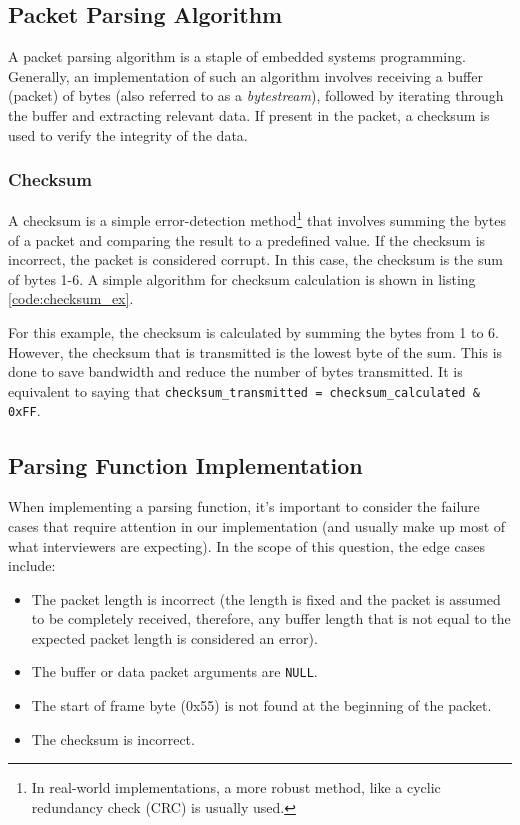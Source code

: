 \documentclass[main.tex]{subfiles}
\begin{document}
\spoilerline

\subsection{Packet Parsing Algorithm}
A packet parsing algorithm is a staple of embedded systems programming. Generally, an implementation of such an algorithm involves receiving a buffer (packet) of bytes (also referred to as a \textit{bytestream}), followed by iterating through the buffer and extracting relevant data. If present in the packet, a checksum is used to verify the integrity of the data.

\subsubsection{Checksum}
A checksum is a simple error-detection method\footnote{In real-world implementations, a more robust method, like a cyclic redundancy check (CRC) is usually used.} that involves summing the bytes of a packet and comparing the result to a predefined value. If the checksum is incorrect, the packet is considered corrupt. In this case, the checksum is the sum of bytes 1-6. A simple algorithm for checksum calculation is shown in listing \ref{code:checksum_ex}.



\noindent For this example, the checksum is calculated by summing the bytes from 1 to 6. However, the checksum that is transmitted is the lowest byte of the sum. This is done to save bandwidth and reduce the number of bytes transmitted. It is equivalent to saying that \texttt{checksum\_transmitted = checksum\_calculated \& 0xFF}.

\subsection{Parsing Function Implementation}
When implementing a parsing function, it's important to consider the failure cases that require attention in our implementation (and usually make up most of what interviewers are expecting). In the scope of this question, the edge cases include:
\begin{itemize}
    \item The packet length is incorrect (the length is fixed and the packet is assumed to be completely received, therefore, any buffer length that is not equal to the expected packet length is considered an error).
    \item The buffer or data packet arguments are \texttt{NULL}.
    \item The start of frame byte (0x55) is not found at the beginning of the packet.
    \item The checksum is incorrect.
\end{itemize}
\end{document}
